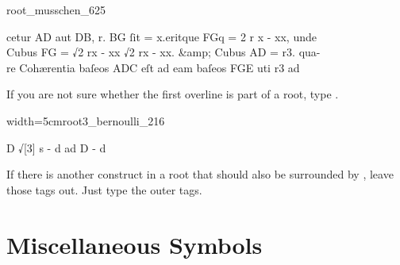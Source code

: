 \vspace{3mm}
\begin{sampleImage}{root_musschen_625}
\begin{typeLatin}
 \someText
cetur AD aut DB, r. BG ſit = x.\lwr eritque FGq = 2 r x - x\lwr x, unde  \\
Cubus FG = √\bold{\{}2 rx - xx\lwr {} √\bold{\{}2 rx - xx.\bold{\}}\lwr{} &amp; Cubus AD = r3. qua- \\
re Cohærentia baſeos ADC eſt ad eam baſeos FGE uti r\lwr{}3 ad \\
\someText {}
\end{typeLatin}
\end{sampleImage}

\begin{note}
If you are not sure whether the first overline is part of a root, type .
\end{note}

\vspace{3mm}
\begin{sampleImageSmall}{width=5cm}{root3_bernoulli_216}
\begin{typeLatin}
D √[3] s - d ad D - \lwr{}d
\end{typeLatin}
\end{sampleImageSmall}

\begin{note}
If there is another construct in a root that should also be surrounded by , leave those tags out. Just type the outer  tags.
\end{note}



\section{Miscellaneous Symbols}

